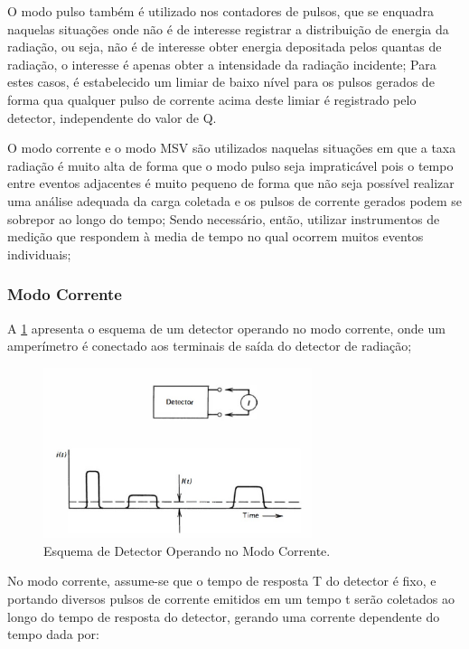 \documentclass[11pt,a4paper]{article}
\begin{document}
		O \textcolor{CarnationPink}{modo pulso} também é utilizado nos \textcolor{CarnationPink}{contadores de pulsos}, que se enquadra naquelas situações onde não é de interesse registrar a distribuição de energia da radiação, ou seja, não é de interesse obter energia depositada pelos quantas de radiação, o interesse é apenas obter a intensidade da radiação incidente; Para estes casos, é estabelecido um limiar de baixo nível para os pulsos gerados de forma qua qualquer pulso de corrente acima deste limiar é registrado pelo detector, independente do valor de Q.

		O \textcolor{CarnationPink}{modo corrente} e o \textcolor{CarnationPink}{modo MSV} são utilizados naquelas situações em que a taxa radiação é muito alta de forma que o modo pulso seja impraticável pois o tempo entre eventos adjacentes é muito pequeno de forma que não seja possível realizar uma análise adequada da carga coletada e os pulsos de corrente gerados podem se sobrepor ao longo do tempo; Sendo necessário, então, utilizar instrumentos de medição que respondem à media de tempo no qual ocorrem muitos eventos individuais;

		\subsubsection{Modo Corrente}

			A  \ref{fig:esquemaModoCorrente} apresenta o esquema de um detector operando no modo corrente, onde um amperímetro é conectado aos terminais de saída do detector de radiação;

				\begin{figure}[h]
					\centering
					\includegraphics[width=0.7\textwidth]{Imagens/esquemaModoCorrente.jpg}
					\caption{Esquema de Detector Operando no Modo Corrente.}
					\label{fig:esquemaModoCorrente}
				\end{figure}
			
			No modo corrente, assume-se que o tempo de resposta T do detector é fixo, e portando diversos pulsos de corrente emitidos em um tempo t serão coletados ao longo do tempo de resposta do detector, gerando uma corrente dependente do tempo dada por:
			
\end{document}
